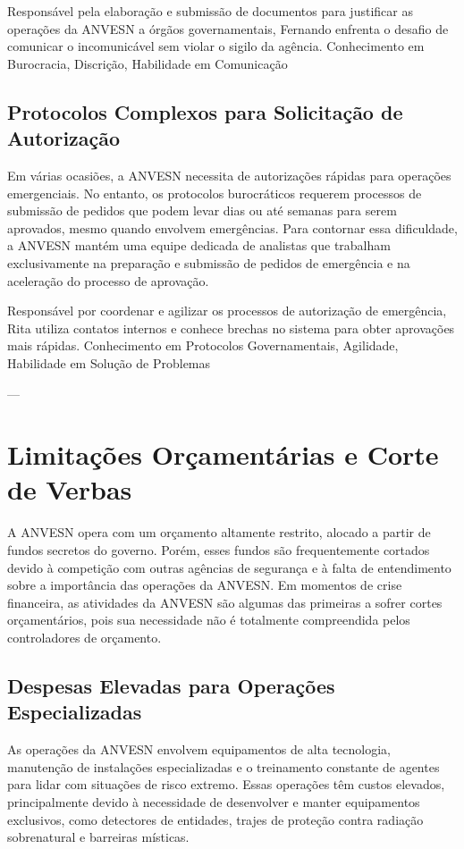{Responsável pela elaboração e submissão de documentos para justificar as operações da ANVESN a órgãos governamentais, Fernando enfrenta o desafio de comunicar o incomunicável sem violar o sigilo da agência.}
{Conhecimento em Burocracia, Discrição, Habilidade em Comunicação}

\subsection{Protocolos Complexos para Solicitação de Autorização}
Em várias ocasiões, a ANVESN necessita de autorizações rápidas para operações emergenciais. No entanto, os protocolos burocráticos requerem processos de submissão de pedidos que podem levar dias ou até semanas para serem aprovados, mesmo quando envolvem emergências. Para contornar essa dificuldade, a ANVESN mantém uma equipe dedicada de analistas que trabalham exclusivamente na preparação e submissão de pedidos de emergência e na aceleração do processo de aprovação.

{Responsável por coordenar e agilizar os processos de autorização de emergência, Rita utiliza contatos internos e conhece brechas no sistema para obter aprovações mais rápidas.}
{Conhecimento em Protocolos Governamentais, Agilidade, Habilidade em Solução de Problemas}

---

\section{Limitações Orçamentárias e Corte de Verbas}
A ANVESN opera com um orçamento altamente restrito, alocado a partir de fundos secretos do governo. Porém, esses fundos são frequentemente cortados devido à competição com outras agências de segurança e à falta de entendimento sobre a importância das operações da ANVESN. Em momentos de crise financeira, as atividades da ANVESN são algumas das primeiras a sofrer cortes orçamentários, pois sua necessidade não é totalmente compreendida pelos controladores de orçamento.

\subsection{Despesas Elevadas para Operações Especializadas}
As operações da ANVESN envolvem equipamentos de alta tecnologia, manutenção de instalações especializadas e o treinamento constante de agentes para lidar com situações de risco extremo. Essas operações têm custos elevados, principalmente devido à necessidade de desenvolver e manter equipamentos exclusivos, como detectores de entidades, trajes de proteção contra radiação sobrenatural e barreiras místicas.


